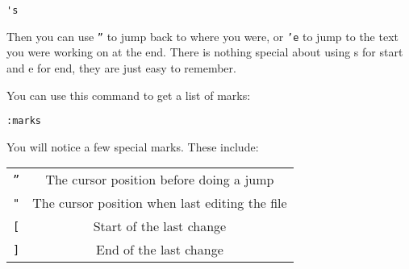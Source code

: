  \begin{Verbatim}[samepage=true]
 's
 \end{Verbatim}

Then you can use \texttt{''} to jump back to where you were, or \texttt{'e} to jump to the text
you were working on at the end.
There is nothing special about using s for start and e for end, they are
just easy to remember.

You can use this command to get a list of marks:

 \begin{Verbatim}[samepage=true]
 :marks
 \end{Verbatim}

You will notice a few special marks.  These include:
\begin{center}
				\begin{tabular}{c c}
				\texttt{''} & The cursor position before doing a jump\\
				\texttt{"} & The cursor position when last editing the file\\
				\texttt{[} & Start of the last change\\
				\texttt{]} &   End of the last change\\
\end{tabular}
\end{center}
\clearpage
